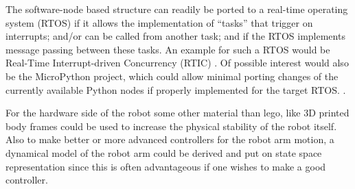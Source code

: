 The software-node based structure can readily be ported to a real-time
operating system (RTOS) if it allows the implementation of ``tasks''
that trigger on interrupts; and/or can be called from another task; and
if the RTOS implements message passing between these tasks. An example
for such a RTOS would be Real-Time Interrupt-driven Concurrency (RTIC)
\parencite{rtic}. Of possible interest would also be the MicroPython
project, which could allow minimal porting changes of the currently
available Python nodes if properly implemented for the target RTOS.
\parencite{micropython}.

For the hardware side of the robot some other material than lego, like 3D printed body frames could be used to increase the physical stability of the robot itself. Also to make better or more advanced controllers for the robot arm motion, a dynamical model of the robot arm could be derived and put on state space representation since this is often advantageous if one wishes to make a good controller.

